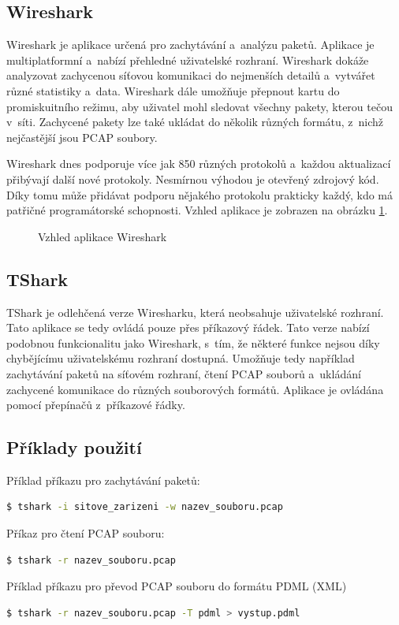 \subsection{Wireshark}
Wireshark je aplikace určená pro zachytávání a~analýzu paketů. Aplikace je multiplatformní a~nabízí přehledné uživatelské rozhraní. Wireshark dokáže analyzovat zachycenou síťovou komunikaci do nejmenších detailů a~vytvářet různé statistiky a~data. Wireshark dále umožňuje přepnout kartu do promiskuitního režimu, aby uživatel mohl sledovat všechny pakety, kterou tečou v~síti. Zachycené pakety lze také ukládat do několik různých formátu, z~nichž nejčastější jsou PCAP soubory.

Wireshark dnes podporuje více jak 850 různých protokolů a~každou aktualizací přibývají další nové protokoly. Nesmírnou výhodou je otevřený zdrojový kód. Díky tomu může přidávat podporu nějakého protokolu prakticky každý, kdo má patřičné programátorské schopnosti. Vzhled aplikace je zobrazen na obrázku \ref{img:wireshark}.

\begin{figure}[H]
    \centering
    \caption{Vzhled aplikace Wireshark}
    \label{img:wireshark}
\end{figure}

\subsection{TShark}
TShark je odlehčená verze Wiresharku, která neobsahuje uživatelské rozhraní. Tato aplikace se tedy ovládá pouze přes příkazový řádek. Tato verze nabízí podobnou funkcionalitu jako Wireshark, s~tím, že některé funkce nejsou díky chybějícímu uživatelskému rozhraní dostupná. Umožňuje tedy například zachytávání paketů na síťovém rozhraní, čtení PCAP souborů a~ukládání zachycené komunikace do různých souborových formátů. Aplikace je ovládána pomocí přepínačů z~příkazové řádky.

\subsection*{Příklady použití}
Příklad příkazu pro zachytávání paketů:
\begin{lstlisting}[language=bash]
    $ tshark -i sitove_zarizeni -w nazev_souboru.pcap 
\end{lstlisting}
Příkaz pro čtení PCAP souboru:
\begin{lstlisting}[language=bash]
    $ tshark -r nazev_souboru.pcap 
\end{lstlisting}
Příklad příkazu pro převod PCAP souboru do formátu PDML (XML)
\begin{lstlisting}[language=bash]
    $ tshark -r nazev_souboru.pcap -T pdml > vystup.pdml
\end{lstlisting}

